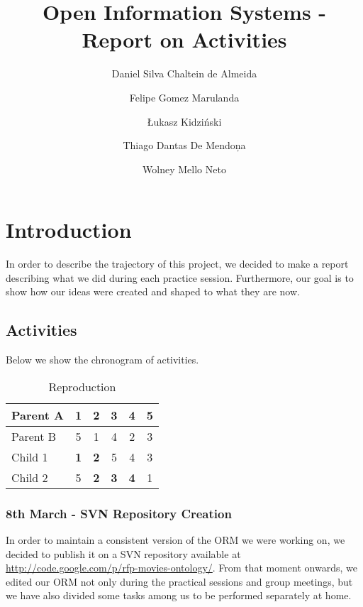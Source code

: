 \documentclass[a4paper,10pt]{article}
\title{Open Information Systems - Report on Activities}
\author{Daniel Silva Chaltein de Almeida
\and Felipe Gomez Marulanda
\and \L{}ukasz Kidzi\'nski
\and Thiago Dantas De Mendon\c{}a
\and Wolney Mello Neto}
\begin{document}
\maketitle

\section{Introduction}
In order to describe the trajectory of this project, we decided to make a report describing what we did during each practice session. Furthermore, our goal is to show how our ideas were created and shaped to what they are now.

\subsection{Activities}
Below we show the chronogram of activities.

\begin{table}[!h]
  \centering
  \caption{Reproduction}
  \begin{tabular}{|l|c|c|c|c|c|}
    \hline
    Parent A & 1 & 2 & 3 & 4 & 5 \\ \hline
    Parent B & 5 & 1 & 4 & 2 & 3 \\ \hline
    Child 1 & \textbf{1} & \textbf{2} & 5 & 4 & 3 \\ \hline
    Child 2 & 5 & \textbf{2} & \textbf{3} & \textbf{4} & 1 \\ \hline
  \end{tabular}
  \label{tab:rep}
\end{table}


\subsubsection*{8th March - SVN Repository Creation}
In order to maintain a consistent version of the ORM we were working on, we decided to publish it on a SVN repository available at \href{http://code.google.com/p/rfp-movies-ontology/}{http://code.google.com/p/rfp-movies-ontology/}. From that moment onwards, we edited our ORM not only during the practical sessions and group meetings, but we have also divided some tasks among us to be performed separately at home.
\end{document}

